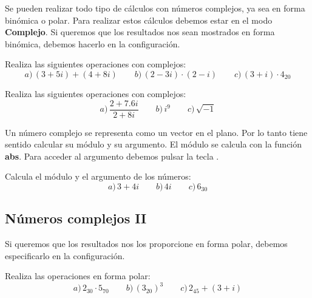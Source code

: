 \documentclass[12pt]{article}
\newcommand{\casiosymbol}[1]{{\footnotesize\casio\symbol{#1}}}
\newenvironment{capitulo}{\begin{tcolorbox}[colback=blue!5!white,colframe=red!75!black]}{\end{tcolorbox}\bigskip}
\newenvironment{ejer}{\begin{tcolorbox}[center title, 
fonttitle=\sffamily\bfseries,colback=blue!5,colframe=orange]}{\end{tcolorbox}}
\begin{document}
Se pueden realizar todo tipo de cálculos con números complejos, ya sea en forma binómica o polar. Para realizar estos cálculos debemos estar en el modo \textbf{Complejo}. Si queremos que los resultados nos sean mostrados en forma binómica, debemos hacerlo en la configuración.

\begin{ejer}

Realiza las siguientes operaciones con complejos:
\[
a)\,  (3+5i) + (4+8i) \qquad b)\, (2-3i)\cdot (2-i)\qquad c)\, (3+i)\cdot 4_{20}
\]

\end{ejer}

\begin{ejer} 

Realiza las siguientes operaciones con complejos:
\[
a)\, \frac{2+7.6i}{2+8i}\qquad b)\, i^9\qquad c)\, \sqrt{-1}
\]

\end{ejer}

Un número complejo se representa como un vector en el plano. Por lo tanto tiene sentido calcular su módulo y su argumento. El módulo se calcula con la función \textbf{abs}. Para acceder al argumento debemos pulsar la tecla \casiosymbol{84}.

\begin{ejer}

Calcula el módulo y el argumento de los números:
\[
a)\, 3+4i \qquad b)\, 4i\qquad c) \, 6_{30}
\]

\end{ejer}




\newpage


\begin{capitulo}
\section*{Números complejos II}
\end{capitulo}

Si queremos que los resultados nos los proporcione en forma polar, debemos especificarlo en la configuración.

 
\begin{ejer}

Realiza las operaciones en forma polar:
\[
a)\, 2_{30} \cdot 5_{70}\qquad b)\, \left(3_{20}\right)^3 \qquad c)\, 2_{45} +(3+i)
\]

\end{ejer}
\end{document}
